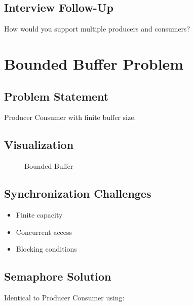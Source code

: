 \subsection{Interview Follow-Up}

How would you support multiple producers and consumers?

\section{Bounded Buffer Problem}

\subsection{Problem Statement}

Producer Consumer with finite buffer size.

\subsection{Visualization}

\begin{figure}[H]
\centering
{}
\caption{Bounded Buffer}
\end{figure}

\subsection{Synchronization Challenges}

\begin{itemize}
\item Finite capacity
\item Concurrent access
\item Blocking conditions
\end{itemize}

\subsection{Semaphore Solution}

Identical to Producer Consumer using:

